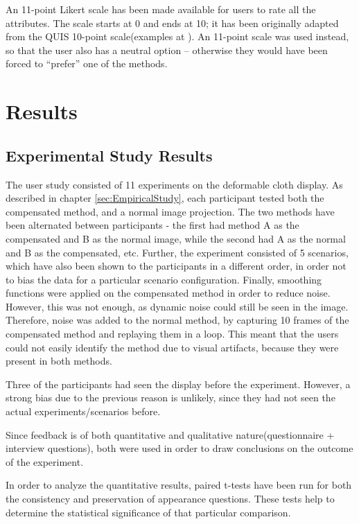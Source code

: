\documentclass[]{article}
\begin{document}
An 11-point Likert scale has been made available for users to rate all the attributes. The scale starts at 0 and ends at 10; it has been originally adapted from the QUIS 10-point scale(examples at \cite{quis}). An 11-point scale was used instead, so that the user also has a neutral option – otherwise they would have been forced to “prefer” one of the methods.


\newpage
\section{Results}
\label{sec:Results}
\subsection{Experimental Study Results}

The user study consisted of 11 experiments on the deformable cloth display. As described in chapter \ref{sec:EmpiricalStudy}, each participant tested both the compensated method, and a normal image projection. The two methods have been alternated between participants - the first had method A as the compensated and B as the normal image, while the second had A as the normal and B as the compensated, etc. Further, the experiment consisted of 5 scenarios, which have also been shown to the participants in a different order, in order not to bias the data for a particular scenario configuration. Finally, smoothing functions were applied on the compensated method in order to reduce noise. However, this was not enough, as dynamic noise could still be seen in the image. Therefore, noise was added to the normal method, by capturing 10 frames of the compensated method and replaying them in a loop. This meant that the users could not easily identify the method due to visual artifacts, because they were present in both methods.

Three of the participants had seen the display before the experiment. However, a strong bias due to the previous reason is unlikely, since they had not seen the actual experiments/scenarios before.

Since feedback is of both quantitative and qualitative nature(questionnaire + interview questions), both were used in order to draw conclusions on the outcome of the experiment.

In order to analyze the quantitative results, paired t-tests have been run for both the consistency and preservation of appearance questions. These tests help to determine the statistical significance of that particular comparison.
\end{document}
